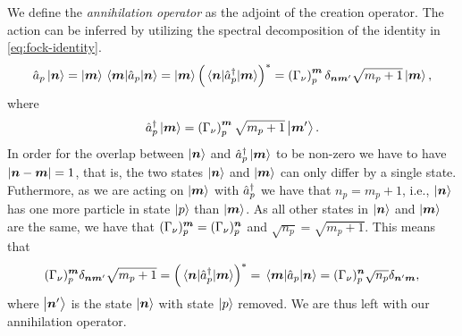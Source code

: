             We define the \emph{annihilation operator} as the adjoint of the
            creation operator.
            The action can be inferred by utilizing the spectral decomposition
            of the identity in \autoref{eq:fock-identity}.
            \begin{align}
                \hat{a}_{p}\ket{\boldsymbol{n}}
                = \ket{\boldsymbol{m}}\mel{\boldsymbol{m}}{\hat{a}_{p}}{\boldsymbol{n}}
                =
                \ket{\boldsymbol{m}}
                \left( 
                    \mel{\boldsymbol{n}}{\hat{a}_{p}^{\dagger}}{\boldsymbol{m}}
                 \right)^{*}
                = \left( \Gamma_{\nu} \right)^{\boldsymbol{m}}_{p}
                \delta_{\boldsymbol{n}\boldsymbol{m}'}
                \sqrt{m_p + 1}
                \ket{\boldsymbol{m}},
            \end{align}
            where
            \begin{align}
                \hat{a}_{p}^{\dagger}\ket{\boldsymbol{m}}
                = \left( \Gamma_{\nu} \right)^{\boldsymbol{m}}_{p}
                \sqrt{m_p + 1}
                \ket{\boldsymbol{m}'}.
            \end{align}
            In order for the overlap between $\ket{\boldsymbol{n}}$ and
            $\hat{a}_{p}^{\dagger}\ket{\boldsymbol{m}}$ to be non-zero we have to have $\abs{\boldsymbol{n}
            - \boldsymbol{m}} = 1$, that is, the two states $\ket{\boldsymbol{n}}$ and
            $\ket{\boldsymbol{m}}$ can only differ by a single state.
            Futhermore, as we are acting on $\ket{\boldsymbol{m}}$ with $\hat{a}_{p}^{\dagger}$ we
            have that $n_p = m_p + 1$, i.e., $\ket{\boldsymbol{n}}$ has one more
            particle in state $\ket{p}$ than $\ket{\boldsymbol{m}}$.
            As all other states in $\ket{\boldsymbol{n}}$ and $\ket{\boldsymbol{m}}$ are the
            same, we have that $(\Gamma_{\nu})^{\boldsymbol{m}}_{p} =
            (\Gamma_{\nu})^{\boldsymbol{n}}_{p}$
            and $\sqrt{n_p} = \sqrt{m_p + 1}$.
            This means that
            \begin{align}
                (\Gamma_{\nu})^{\boldsymbol{m}}_{p}
                \delta_{\boldsymbol{n}\boldsymbol{m}'}
                \sqrt{m_p + 1}
                =
                \left( \mel{\boldsymbol{n}}{\hat{a}_{p}^{\dagger}}{\boldsymbol{m}} \right)^{*}
                =
                \mel{\boldsymbol{m}}{\hat{a}_{p}}{\boldsymbol{n}}
                =
                (\Gamma_{\nu})^{\boldsymbol{n}}_{p}
                \sqrt{n_p}
                \delta_{\boldsymbol{n}'\boldsymbol{m}},
            \end{align}
            where $\ket{\boldsymbol{n}'}$ is the state $\ket{\boldsymbol{n}}$ with state
            $\ket{p}$ removed.
            We are thus left with our annihilation operator.
